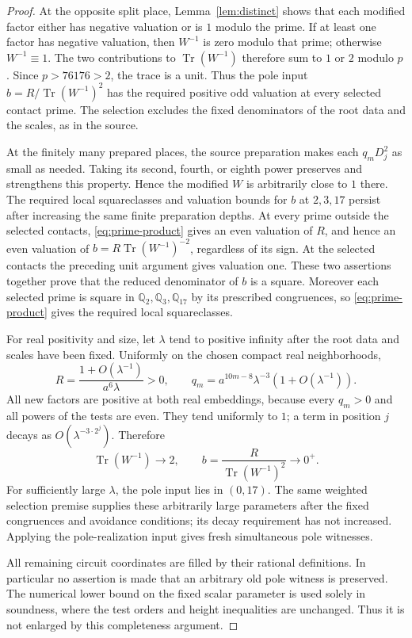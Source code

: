 \documentclass[11pt,a4paper]{article}
\theoremstyle{remark}\newtheorem{remark}[theorem]{Remark}
\newcommand{\Q}{\mathbb Q}\newcommand{\Z}{\mathbb Z}
\DeclareMathOperator{\Tr}{Tr}\DeclareMathOperator{\Nm}{N}
\begin{document}
\begin{proof}
At the opposite split place, Lemma~\ref{lem:distinct} shows that each
modified factor either has negative valuation or is $1$ modulo the
prime. If at least one factor has negative valuation, then $W^{-1}$ is zero
modulo that prime; otherwise $W^{-1}\equiv1$. The two contributions
to $\Tr(W^{-1})$ therefore sum to $1$ or $2$ modulo $p$.
Since $p>76176>2$, the trace is a unit. Thus the pole input
$b=R/\Tr(W^{-1})^2$ has the required positive odd valuation at
every selected contact prime. The selection excludes the fixed
denominators of the root data and the scales, as in the source.

At the finitely many prepared places, the source preparation makes
each $q_mD_j^2$ as small as needed. Taking its second, fourth, or eighth power
preserves and strengthens this property. Hence the modified $W$ is
arbitrarily close to $1$ there. The required local squareclasses and
valuation bounds for $b$ at $2,3,17$ persist after increasing the
same finite preparation depths. At every prime outside the selected
contacts, \eqref{eq:prime-product} gives an even valuation of $R$,
and hence an even valuation of $b=R\Tr(W^{-1})^{-2}$, regardless
of its sign. At the selected contacts the preceding unit argument
gives valuation one. These two assertions together prove that the
reduced denominator of $b$ is a square. Moreover each selected prime
is square in $\Q_2,\Q_3,\Q_{17}$ by its prescribed congruences, so
\eqref{eq:prime-product} gives the required local squareclasses.

For real positivity and size, let $\lambda$ tend to positive infinity
after the root data and scales have been fixed. Uniformly on the chosen
compact real neighborhoods,
\[
 R=\frac{1+O(\lambda^{-1})}{a^6\lambda}>0,
 \qquad
 q_m=a^{10m-8}\lambda^{-3}(1+O(\lambda^{-1})).
\]
All new factors are positive at both real embeddings, because every $q_m>0$
and all powers of the tests are even. They tend uniformly to $1$;
a term in position $j$ decays as $O(\lambda^{-3\cdot2^j})$. Therefore
\[
 \Tr(W^{-1})\longrightarrow2,\qquad
 b=\frac{R}{\Tr(W^{-1})^2}\longrightarrow0^+.
\]
For sufficiently large $\lambda$, the pole input lies in $(0,17)$.
The same weighted selection premise supplies these arbitrarily large
parameters after the fixed congruences and avoidance conditions;
its decay requirement has not increased. Applying the pole-realization
input gives fresh simultaneous pole witnesses.

All remaining circuit coordinates are filled by their rational
definitions. In particular no assertion is made that an arbitrary
old pole witness is preserved. The numerical lower bound on the fixed
scalar parameter is used solely in soundness, where the test orders
and height inequalities are unchanged. Thus it is not enlarged by
this completeness argument.
\end{proof}
\end{document}
